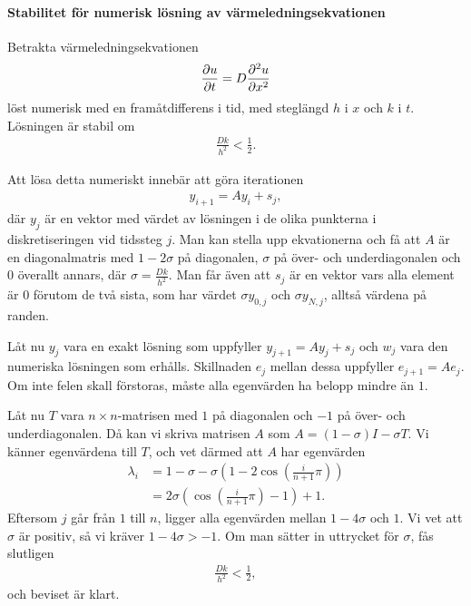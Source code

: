 \paragraph{Stabilitet för numerisk lösning av värmeledningsekvationen}
Betrakta värmeledningsekvationen
\begin{align*}
	\pdv{u}{t} = D\pdv[2]{u}{x}
\end{align*}
löst numerisk med en framåtdifferens i tid, med steglängd $h$ i $x$ och $k$ i $t$. Lösningen är stabil om
\begin{align*}
	\frac{Dk}{h^{2}} < \frac{1}{2}.
\end{align*}

\proof
Att lösa detta numeriskt innebär att göra iterationen
\begin{align*}
	y_{i + 1} = Ay_{i} + s_{j},
\end{align*}
där $y_{j}$ är en vektor med värdet av lösningen i de olika punkterna i diskretiseringen vid tidssteg $j$. Man kan stella upp ekvationerna och få att $A$ är en diagonalmatris med $1 - 2\sigma$ på diagonalen, $\sigma$ på över- och underdiagonalen och $0$ överallt annars, där $\sigma = \frac{Dk}{h^{2}}$. Man får även att $s_{j}$ är en vektor vars alla element är $0$ förutom de två sista, som har värdet $\sigma y_{0, j}$ och $\sigma y_{N, j}$, alltså värdena på randen.

Låt nu $y_{j}$ vara en exakt lösning som uppfyller $y_{j + 1} = Ay_{j} + s_{j}$ och $w_{j}$ vara den numeriska lösningen som erhålls. Skillnaden $e_{j}$ mellan dessa uppfyller $e_{j + 1} = Ae_{j}$. Om inte felen skall förstoras, måste alla egenvärden ha belopp mindre än $1$.

Låt nu $T$ vara $n\times n$-matrisen med $1$ på diagonalen och $-1$ på över- och underdiagonalen. Då kan vi skriva matrisen $A$ som $A = (1 - \sigma)I - \sigma T$. Vi känner egenvärdena till $T$, och vet därmed att $A$ har egenvärden
\begin{align*}
	\lambda_{i} &= 1 - \sigma - \sigma\left(1 - 2\cos(\frac{i}{n + 1}\pi)\right) \\
	            &= 2\sigma\left(\cos(\frac{i}{n + 1}\pi) - 1\right) + 1.
\end{align*}
Eftersom $j$ går från $1$ till $n$, ligger alla egenvärden mellan $1 - 4\sigma$ och $1$. Vi vet att $\sigma$ är positiv, så vi kräver $1 - 4\sigma > -1$. Om man sätter in uttrycket för $\sigma$, fås slutligen
\begin{align*}
	\frac{Dk}{h^{2}} < \frac{1}{2},
\end{align*}
och beviset är klart.